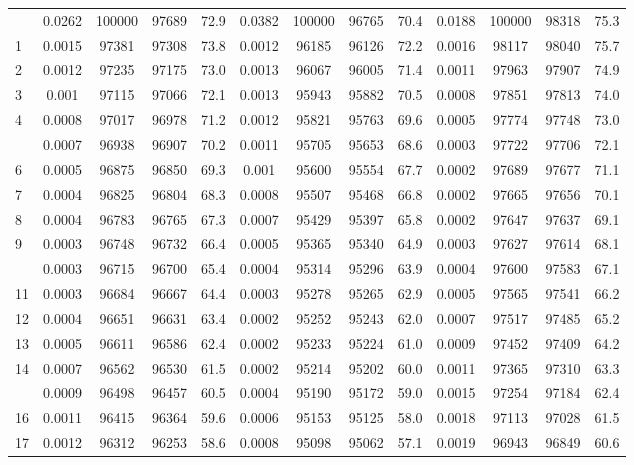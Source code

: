 \documentclass[
  14pt,
]{article}
\begin{document}
\begin{longtable}[t]{lcccccccccccc}
\endfoot
\bottomrule
\endlastfoot
0 & 0.0262 & 100000 & 97689 & 72.9 & 0.0382 & 100000 & 96765 & 70.4 & 0.0188 & 100000 & 98318 & 75.3\\
1 & 0.0015 & 97381 & 97308 & 73.8 & 0.0012 & 96185 & 96126 & 72.2 & 0.0016 & 98117 & 98040 & 75.7\\
2 & 0.0012 & 97235 & 97175 & 73.0 & 0.0013 & 96067 & 96005 & 71.4 & 0.0011 & 97963 & 97907 & 74.9\\
3 & 0.001 & 97115 & 97066 & 72.1 & 0.0013 & 95943 & 95882 & 70.5 & 0.0008 & 97851 & 97813 & 74.0\\
4 & 0.0008 & 97017 & 96978 & 71.2 & 0.0012 & 95821 & 95763 & 69.6 & 0.0005 & 97774 & 97748 & 73.0\\
\addlinespace
5 & 0.0007 & 96938 & 96907 & 70.2 & 0.0011 & 95705 & 95653 & 68.6 & 0.0003 & 97722 & 97706 & 72.1\\
6 & 0.0005 & 96875 & 96850 & 69.3 & 0.001 & 95600 & 95554 & 67.7 & 0.0002 & 97689 & 97677 & 71.1\\
7 & 0.0004 & 96825 & 96804 & 68.3 & 0.0008 & 95507 & 95468 & 66.8 & 0.0002 & 97665 & 97656 & 70.1\\
8 & 0.0004 & 96783 & 96765 & 67.3 & 0.0007 & 95429 & 95397 & 65.8 & 0.0002 & 97647 & 97637 & 69.1\\
9 & 0.0003 & 96748 & 96732 & 66.4 & 0.0005 & 95365 & 95340 & 64.9 & 0.0003 & 97627 & 97614 & 68.1\\
\addlinespace
10 & 0.0003 & 96715 & 96700 & 65.4 & 0.0004 & 95314 & 95296 & 63.9 & 0.0004 & 97600 & 97583 & 67.1\\
11 & 0.0003 & 96684 & 96667 & 64.4 & 0.0003 & 95278 & 95265 & 62.9 & 0.0005 & 97565 & 97541 & 66.2\\
12 & 0.0004 & 96651 & 96631 & 63.4 & 0.0002 & 95252 & 95243 & 62.0 & 0.0007 & 97517 & 97485 & 65.2\\
13 & 0.0005 & 96611 & 96586 & 62.4 & 0.0002 & 95233 & 95224 & 61.0 & 0.0009 & 97452 & 97409 & 64.2\\
14 & 0.0007 & 96562 & 96530 & 61.5 & 0.0002 & 95214 & 95202 & 60.0 & 0.0011 & 97365 & 97310 & 63.3\\
\addlinespace
15 & 0.0009 & 96498 & 96457 & 60.5 & 0.0004 & 95190 & 95172 & 59.0 & 0.0015 & 97254 & 97184 & 62.4\\
16 & 0.0011 & 96415 & 96364 & 59.6 & 0.0006 & 95153 & 95125 & 58.0 & 0.0018 & 97113 & 97028 & 61.5\\
17 & 0.0012 & 96312 & 96253 & 58.6 & 0.0008 & 95098 & 95062 & 57.1 & 0.0019 & 96943 & 96849 & 60.6\\

\end{longtable}
\end{document}
